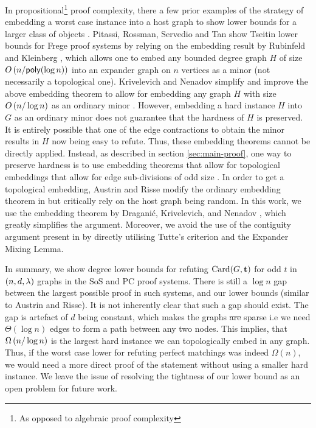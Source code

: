 \documentclass[11pt]{article}
\providecommand{\DIFdel}[1]{\textcolor{verylightgray}{\sout{#1}}}                      %
\providecommand{\DIFdelbegin}{} %
\providecommand{\DIFdelend}{} %
\begin{document}
In propositional\footnote{As opposed to algebraic proof complexity} proof complexity, there a few prior examples of the strategy of embedding a worst case instance into a host graph to show lower bounds for a larger class of objects \cite{itsykson2021Near, pitassi2016PolyLogFrege}.
Pitassi, Rossman, Servedio and Tan show Tseitin lower bounds for Frege proof systems \citep{pitassi2016PolyLogFrege} by relying on the embedding result by Rubinfeld and Kleinberg \citep{kleinberg1996short}, which allows one to embed any bounded degree graph $H$ of size $O\left(n/\mathsf{poly}(\log n)\right)$ into an expander graph on $n$ vertices as a minor (not necessarily a topological one). 
Krivelevich and Nenadov simplify and improve the above embedding theorem to allow for embedding any graph $H$ with size $O\left(n/\log n\right)$ as an ordinary minor \citep{krivelevich2021completeMinors}.
However, embedding a hard instance $H$ into $G$ as an ordinary minor does not guarantee that the hardness of $H$ is preserved.
It is entirely possible that one of the edge contractions to obtain the minor results in $H$ now being easy to refute.
Thus, these embedding theorems cannot be directly applied.
Instead, as described in section \ref{sec:main-proof}, one way to preserve hardness is to use  embedding theorems that allow for topological embeddings that allow for edge sub-divisions of odd size \citep{draganic22rolling, nenadov2023routing}.
In order to get a topological embedding, Austrin and Risse modify the ordinary embedding theorem in \citep{krivelevich2021completeMinors} but critically rely on the host graph being random.
In this work, we use the embedding theorem by Dragani\'c, Krivelevich, and Nenadov \cite{draganic22rolling}, which greatly simplifies the argument. Moreover, we avoid the use of the contiguity argument present in \cite{Austrin_2022} by directly utilising Tutte's criterion and the Expander Mixing Lemma.

\par
In summary, we show degree lower bounds for refuting $\text{Card}(G, \mathbf{t})$ for odd $t$ in $(n, d, \lambda)$ graphs in the SoS and PC proof systems.
There is still a $\log n$ gap between the largest possible proof in such systems, and our lower bounds (similar to Austrin and Risse).
It is not inherently clear that such a gap should exist.
The gap is artefact of $d$ being constant, which makes the graphs \DIFdelbegin \DIFdel{are }\DIFdelend sparse i.e we need $\Theta(\log n)$ edges to form a path between any two nodes.
This implies, that $\Omega\left(n/\log n\right)$ is the largest hard instance we can topologically embed in any graph.
Thus, if the worst case lower for refuting perfect matchings was indeed $\Omega(n)$, we would need a more direct proof of the statement without using a smaller hard instance.
We leave the issue of resolving the tightness of our lower bound as an open problem for future work.



\clearpage
\appendix
\end{document}
